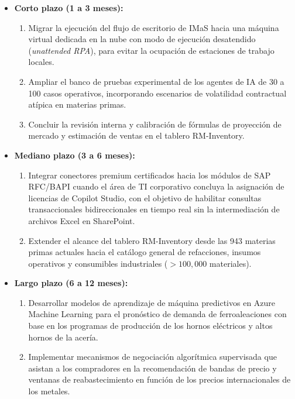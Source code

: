 \begin{itemize}
    \item \textbf{Corto plazo (1 a 3 meses):}
    \begin{enumerate}
        \item Migrar la ejecución del flujo de escritorio de IMaS hacia una máquina virtual dedicada en la nube con modo de ejecución desatendido (\emph{unattended RPA}), para evitar la ocupación de estaciones de trabajo locales.
        \item Ampliar el banco de pruebas experimental de los agentes de IA de 30 a 100 casos operativos, incorporando escenarios de volatilidad contractual atípica en materias primas.
        \item Concluir la revisión interna y calibración de fórmulas de proyección de mercado y estimación de ventas en el tablero RM-Inventory.
    \end{enumerate}
    \item \textbf{Mediano plazo (3 a 6 meses):}
    \begin{enumerate}
        \item Integrar conectores premium certificados hacia los módulos de SAP RFC/BAPI cuando el área de TI corporativo concluya la asignación de licencias de Copilot Studio, con el objetivo de habilitar consultas transaccionales bidireccionales en tiempo real sin la intermediación de archivos Excel en SharePoint.
        \item Extender el alcance del tablero RM-Inventory desde las 943 materias primas actuales hacia el catálogo general de refacciones, insumos operativos y consumibles industriales ($>100,000$ materiales).
    \end{enumerate}
    \item \textbf{Largo plazo (6 a 12 meses):}
    \begin{enumerate}
        \item Desarrollar modelos de aprendizaje de máquina predictivos en Azure Machine Learning para el pronóstico de demanda de ferroaleaciones con base en los programas de producción de los hornos eléctricos y altos hornos de la acería.
        \item Implementar mecanismos de negociación algorítmica supervisada que asistan a los compradores en la recomendación de bandas de precio y ventanas de reabastecimiento en función de los precios internacionales de los metales.
    \end{enumerate}
\end{itemize}